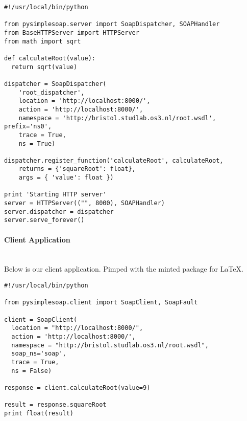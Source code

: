 \begin{verbatim}
#!/usr/local/bin/python
 
from pysimplesoap.server import SoapDispatcher, SOAPHandler
from BaseHTTPServer import HTTPServer
from math import sqrt
 
def calculateRoot(value):
  return sqrt(value)
 
dispatcher = SoapDispatcher(
    'root_dispatcher',
    location = 'http://localhost:8000/',
    action = 'http://localhost:8000/',
    namespace = 'http://bristol.studlab.os3.nl/root.wsdl', prefix='ns0',
    trace = True,
    ns = True)
 
dispatcher.register_function('calculateRoot', calculateRoot,
    returns = {'squareRoot': float},
    args = { 'value': float })
 
print 'Starting HTTP server'
server = HTTPServer(("", 8000), SOAPHandler)
server.dispatcher = dispatcher
server.serve_forever()
\end{verbatim}

\paragraph{Client Application}\mbox{}\\
Below is our client application. Pimped with the minted package for \LaTeX.

\begin{verbatim}
#!/usr/local/bin/python
 
from pysimplesoap.client import SoapClient, SoapFault
 
client = SoapClient(
  location = "http://localhost:8000/",
  action = 'http://localhost:8000/',
  namespace = "http://bristol.studlab.os3.nl/root.wsdl", 
  soap_ns='soap',
  trace = True,
  ns = False)
 
response = client.calculateRoot(value=9)
 
result = response.squareRoot
print float(result)
\end{verbatim}
